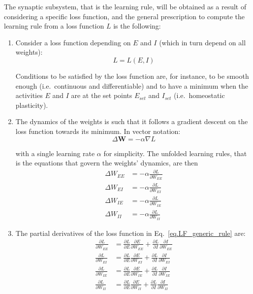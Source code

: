 \documentclass[twocolumn]{article}
\newcommand{\EE}{\mathit{EE}}
\newcommand{\EI}{\mathit{EI}}
\newcommand{\IE}{\mathit{IE}}
\newcommand{\II}{\mathit{II}}
\newcommand{\set}{\mathit{set}}
\begin{document}
The synaptic subsystem, that is the learning rule, will be obtained as a result of considering a specific loss function, and the general prescription to compute the learning rule from a loss function $L$ is the following:
\begin{enumerate}
\item Consider a loss function depending on $E$ and $I$ (which in turn depend on all weights):
\begin{displaymath}
L = L(E,I)
\end{displaymath}

\noindent Conditions to be satisfied by the loss function are, for instance, to be smooth enough (i.e.\ continuous and differentiable) and to have a minimum when the activities $E$ and $I$ are at the set points $E_{\set}$ and $I_{\set}$ (i.e.\ homeostatic plasticity).

\item The dynamics of the weights is such that it follows a gradient descent on the loss function towards its minimum. In vector notation:
\begin{equation}
\Delta \mathbf{W} = -\alpha \nabla L
\label{eq.LF_gradient}
\end{equation}

\noindent with a single learning rate $\alpha$ for simplicity. The unfolded learning rules, that is the equations that govern the weights' dynamics, are then
\begin{equation}
\begin{aligned}
\Delta W_{\EE} & = - \alpha \frac{\partial L}{\partial W_{\EE}} \\
\Delta W_{\EI} & = - \alpha \frac{\partial L}{\partial W_{\EI}} \\
\Delta W_{\IE} & = - \alpha \frac{\partial L}{\partial W_{\IE}} \\
\Delta W_{\II} & = - \alpha \frac{\partial L}{\partial W_{\II}} \end{aligned}
\label{eq.LF_generic_rule}
\end{equation}


\item The partial derivatives of the loss function in Eq.\ \ref{eq.LF_generic_rule} are:
\begin{equation}
\begin{aligned}
\frac{\partial L}{\partial W_{\EE}} & = \frac{\partial L}{\partial E} \frac{\partial E}{\partial W_{\EE}} + \frac{\partial L}{\partial I} \frac{\partial I}{\partial W_{\EE}} \\
\frac{\partial L}{\partial W_{\EI}} & = \frac{\partial L}{\partial E} \frac{\partial E}{\partial W_{\EI}} + \frac{\partial L}{\partial I} \frac{\partial I}{\partial W_{\EI}} \\
\frac{\partial L}{\partial W_{\IE}} & = \frac{\partial L}{\partial E} \frac{\partial E}{\partial W_{\IE}} + \frac{\partial L}{\partial I} \frac{\partial I}{\partial W_{\IE}} \\
\frac{\partial L}{\partial W_{\II}} & = \frac{\partial L}{\partial E} \frac{\partial E}{\partial W_{\II}} + \frac{\partial L}{\partial I} \frac{\partial I}{\partial W_{\II}} \end{aligned}
\label{eq.LF_chain_rule}
\end{equation}


\end{enumerate}
\end{document}
